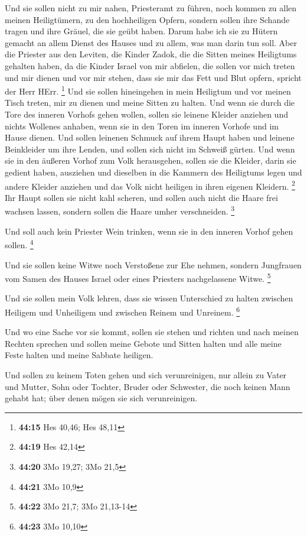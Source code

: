  Und sie sollen nicht zu mir nahen, Priesteramt zu führen,
noch kommen zu allen meinen Heiligtümern, zu den hochheiligen Opfern,
sondern sollen ihre Schande tragen und ihre Gräuel, die sie geübt haben.
 Darum habe ich sie zu Hütern gemacht an allem Dienst des
Hauses und zu allem, was man darin tun soll.  Aber die
Priester aus den Leviten, die Kinder Zadok, die die Sitten meines
Heiligtums gehalten haben, da die Kinder Israel von mir abfielen, die
sollen vor mich treten und mir dienen und vor mir stehen, dass sie mir
das Fett und Blut opfern, spricht der Herr HErr. \footnote{\textbf{44:15}
  Hes 40,46; Hes 48,11}  Und sie sollen hineingehen in mein
Heiligtum und vor meinen Tisch treten, mir zu dienen und meine Sitten zu
halten.  Und wenn sie durch die Tore des inneren Vorhofs
gehen wollen, sollen sie leinene Kleider anziehen und nichts Wollenes
anhaben, wenn sie in den Toren im inneren Vorhofe und im Hause dienen.
 Und sollen leinenen Schmuck auf ihrem Haupt haben und
leinene Beinkleider um ihre Lenden, und sollen sich nicht im Schweiß
gürten.  Und wenn sie in den äußeren Vorhof zum Volk
herausgehen, sollen sie die Kleider, darin sie gedient haben, ausziehen
und dieselben in die Kammern des Heiligtums legen und andere Kleider
anziehen und das Volk nicht heiligen in ihren eigenen Kleidern.
\footnote{\textbf{44:19} Hes 42,14}  Ihr Haupt sollen sie
nicht kahl scheren, und sollen auch nicht die Haare frei wachsen lassen,
sondern sollen die Haare umher verschneiden. \footnote{\textbf{44:20}
  3Mo 19,27; 3Mo 21,5}

 Und soll auch kein Priester Wein trinken, wenn sie in den
inneren Vorhof gehen sollen. \footnote{\textbf{44:21} 3Mo 10,9}

 Und sie sollen keine Witwe noch Verstoßene zur Ehe nehmen,
sondern Jungfrauen vom Samen des Hauses Israel oder eines Priesters
nachgelassene Witwe. \footnote{\textbf{44:22} 3Mo 21,7; 3Mo 21,13-14}

 Und sie sollen mein Volk lehren, dass sie wissen
Unterschied zu halten zwischen Heiligem und Unheiligem und zwischen
Reinem und Unreinem. \footnote{\textbf{44:23} 3Mo 10,10}

 Und wo eine Sache vor sie kommt, sollen sie stehen und
richten und nach meinen Rechten sprechen und sollen meine Gebote und
Sitten halten und alle meine Feste halten und meine Sabbate heiligen.

 Und sollen zu keinem Toten gehen und sich verunreinigen,
nur allein zu Vater und Mutter, Sohn oder Tochter, Bruder oder
Schwester, die noch keinen Mann gehabt hat; über denen mögen sie sich
verunreinigen.

